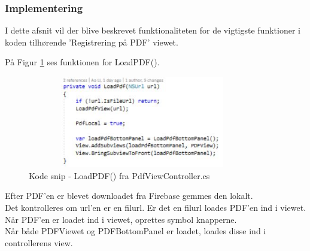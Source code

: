 \clearpage

\subsubsection{Implementering}
I dette afsnit vil der blive beskrevet funktionaliteten for de vigtigste funktioner i koden tilhørende 'Registrering på PDF' viewet.

På Figur \ref{fig:LoadPDF} ses funktionen for LoadPDF().
\begin{figure}[H] %
	\centering
	\includegraphics[height=4cm, width=10cm]{../ArkitekturDesign/Design/RegisterPDF/LoadPDF}
	\caption{Kode snip - LoadPDF() fra PdfViewController.cs}
	\label{fig:LoadPDF}
\end{figure}
Efter PDF'en er blevet downloadet fra Firebase gemmes den lokalt. \\
Det kontrolleres om url'en er en filurl. Er det en filurl loades PDF'en ind i viewet. \\
Når PDF'en er loadet ind i viewet, oprettes symbol knapperne. \\
Når både PDFViewet og PDFBottomPanel er loadet, loades disse ind i controllerens view.

\clearpage

